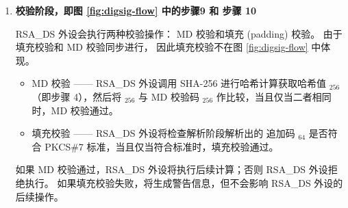 \documentclass[main\_\_CN.tex]{subfiles}
\begin{document}
\begin{enumerate}
        显然，RSA\_DS 外设能够通过 \begin{math}P\end{math} 解析出 \begin{math}[Y]_{3072}\end{math}、\begin{math}[M]_{3072}\end{math}、\begin{math}[\overline{r}]_{3072}\end{math}、\begin{math}[M^{\prime}]_{32}\end{math}、\begin{math}[L]_{32}\end{math}、MD 校验码和追加码 \begin{math}[\beta]_{64} \end{math}，这相当于步骤 5 的逆过程。
        
    \item {\bfseries 校验阶段，即图 \ref{fig:digsig-flow} 中的步骤9 和 步骤 10}
        
        RSA\_DS 外设会执行两种校验操作： MD 校验和填充 (padding) 校验。 
        由于填充校验和 MD 校验同步进行， 因此填充校验不在图 \ref{fig:digsig-flow} 中体现。 
        
        
        \begin{itemize}
    
            \item MD 校验 —— RSA\_DS 外设调用 SHA-256 进行哈希计算获取哈希值 \begin{math}[CALC\_MD]_{256}\end{math}（即步骤 4），然后将 \begin{math}[CALC\_MD]_{256}\end{math} 与 MD 校验码 \begin{math}[MD]_{256}\end{math} 作比较，当且仅当二者相同时，MD 校验通过。
            
            \item 填充校验 —— RSA\_DS 外设将检查解析阶段解析出的 追加码 \begin{math}[\beta]_{64} \end{math} 是否符合 PKCS\#7 标准，当且仅当符合标准时，填充校验通过。
                    
        \end{itemize}
        
        如果 MD 校验通过，RSA\_DS 外设将执行后续计算；否则 RSA\_DS 外设拒绝执行。
        如果填充校验失败，将生成警告信息，但不会影响 RSA\_DS 外设的后续操作。
    

\end{enumerate}
\end{document}
